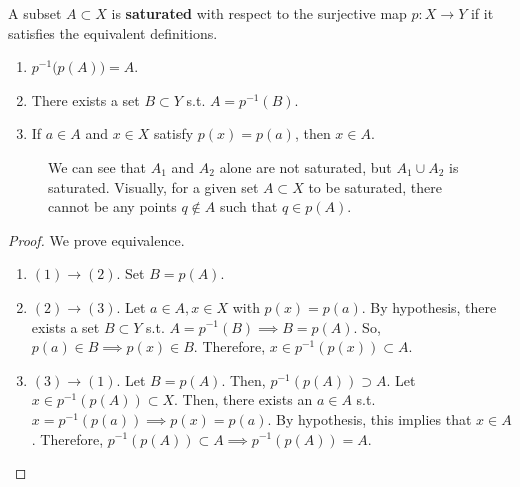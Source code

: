   \begin{definition}
    \label{def:saturated-sets}
    A subset $A \subset X$ is \textbf{saturated} with respect to the surjective map $p: X \rightarrow Y$ if it satisfies the equivalent definitions. 
		\begin{enumerate}
			\item $p^{-1} \big( p(A) \big) = A$. 
			\item There exists a set $B \subset Y$ s.t. $A = p^{-1}(B)$. 
			\item If $a \in A$ and $x \in X$ satisfy $p(x) = p(a)$, then $x \in A$. 
		\end{enumerate}

    \begin{figure}[H]
      \centering 
      \caption{We can see that $A_1$ and $A_2$ alone are not saturated, but $A_1 \cup A_2$ is saturated. Visually, for a given set $A \subset X$ to be saturated, there cannot be any points $q \not\in A$ such that $q \in p(A)$. }
      \label{fig:saturation}
    \end{figure}
  \end{definition}
	\begin{proof}
	  We prove equivalence. 
		\begin{enumerate}
		  \item $(1) \rightarrow (2)$. Set $B = p(A)$. 
			\item $(2) \rightarrow (3)$. Let $a \in A, x \in X$ with $p(x) = p(a)$. By hypothesis, there exists a set $B \subset Y$ s.t. $A = p^{-1}(B) \implies B = p(A)$. So, $p(a) \in B \implies p(x) \in B$. Therefore, $x \in p^{-1}(p(x)) \subset A$. 
			\item $(3) \rightarrow (1)$. Let $B = p(A)$. Then, $p^{-1} (p(A)) \supset A$.  Let $x \in p^{-1} (p(A)) \subset X$. Then, there exists an $a \in A$ s.t. $x = p^{-1}(p(a)) \implies p(x) = p(a)$. By hypothesis, this implies that $x \in A$. Therefore, $p^{-1}(p(A)) \subset A \implies p^{-1}(p(A)) = A$. 
		\end{enumerate}
	\end{proof}


